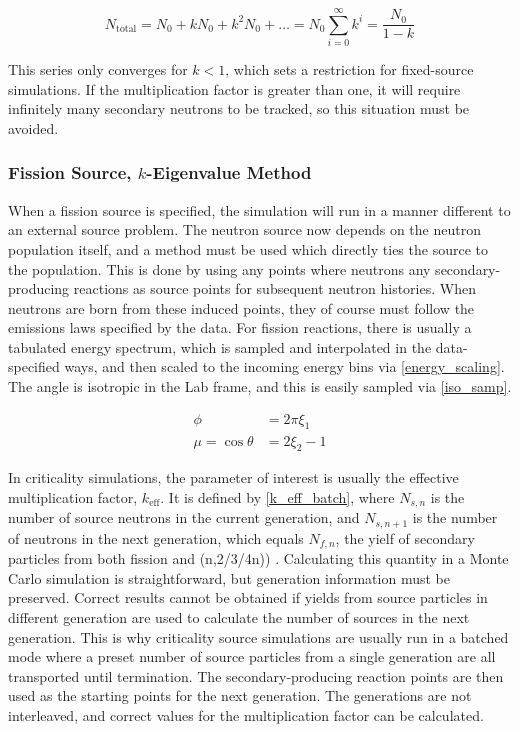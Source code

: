 \begin{equation}
\label{sub_crit_mult}
N_\mathrm{total} = N_0 + k N_0 + k^2 N_0 + \dots = N_0 \sum_{i=0}^\infty k^i = \frac{N_0}{1-k}
\end{equation}

This series only converges for $k<1$, which sets a restriction for fixed-source simulations.  If the multiplication factor is greater than one, it will require infinitely many secondary neutrons to be tracked, so this situation must be avoided.

\subsubsection{Fission Source, $k$-Eigenvalue Method}

When a fission source is specified, the simulation will run in a manner different to an external source problem.  The neutron source now depends on the neutron population itself, and a method must be used which directly ties the source to the population.  This is done by using any points where neutrons any secondary-producing reactions as source points for subsequent neutron histories.  When neutrons are born from these induced points, they of course must follow the emissions laws specified by the data.  For fission reactions, there is usually a tabulated energy spectrum, which is sampled and interpolated in the data-specified ways, and then scaled to the incoming energy bins via \eqref{energy_scaling}.  The angle is isotropic in the Lab frame, and this is easily sampled via \eqref{iso_samp}.

\begin{equation}
\label{iso_samp}
\begin{split}
\phi &= 2 \pi \xi_1 \\
\mu= \cos \theta &= 2 \xi_2 -1
\end{split}
\end{equation}

In criticality simulations, the parameter of interest is usually the effective multiplication factor, $k_\mathrm{eff}$.  It is defined by \eqref{k_eff_batch}, where $N_{s,n}$ is the number of source neutrons in the current generation, and $N_{s,n+1}$ is the number of neutrons in the next generation, which equals $N_{f,n}$, the yielf of secondary particles from both fission and (n,2/3/4n)) \cite{jaakko}.  Calculating this quantity in a Monte Carlo simulation is straightforward, but generation information must be preserved.  Correct results cannot be obtained if yields from source particles in different generation are used to calculate the number of sources in the next generation.  This is why criticality source simulations are usually run in a batched mode where a preset number of source particles from a single generation are all transported until termination.  The secondary-producing reaction points are then used as the starting points for the next generation.  The generations are not interleaved, and correct values for the multiplication factor can be calculated.

